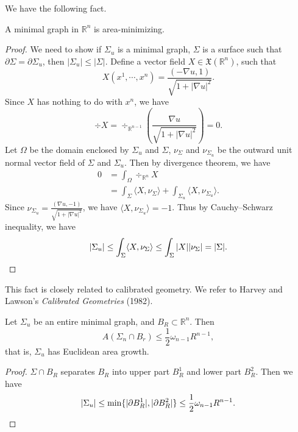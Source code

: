 We have the following fact.
\begin{prop}
    A minimal graph in $\mathbb{R}^n$ is area-minimizing.
\end{prop}
\begin{proof}
    We need to show if $\Sigma_u$ is a minimal graph, $\Sigma$ is a surface such that $\partial\Sigma=\partial\Sigma_u$, then $|\Sigma_u|\leq|\Sigma|$.
    Define a vector field $X\in\mathfrak{X}(\mathbb{R}^n)$, such that
    \[X(x^1,\cdots,x^n)=\frac{(-\nabla u,1)}{\sqrt{1+|\nabla u|^2}}.\]
    Since $X$ has nothing to do with $x^n$, we have
    \[\div{X}=\div\nolimits_{\mathbb{R}^{n-1}}\left(\frac{\nabla u}{\sqrt{1+|\nabla u|^2}}\right)=0.\]
    Let $\Omega$ be the domain enclosed by $\Sigma_u$ and $\Sigma$, $\nu_\Sigma$ and $\nu_{\Sigma_u}$ be the outward unit normal vector field of $\Sigma$ and $\Sigma_u$.
    Then by divergence theorem, we have
    \begin{align*}
        0&=\int_\Omega\div\nolimits_{\mathbb{R}^n}X\\
        &=\int_\Sigma\langle X,\nu_\Sigma\rangle+\int_{\Sigma_u}\langle X,\nu_{\Sigma_u}\rangle.
    \end{align*}
    Since $\nu_{\Sigma_u}=\frac{(\nabla u,-1)}{\sqrt{1+|\nabla u|^2}}$, we have $\langle X,\nu_{\Sigma_u}\rangle=-1$.
    Thus by Cauchy--Schwarz inequality, we have
    \[|\Sigma_u|\leq\int_\Sigma\langle X,\nu_\Sigma\rangle\leq\int_\Sigma|X||\nu_\Sigma|=|\Sigma|.\qedhere\]
\end{proof}

\begin{rem}
    This fact is closely related to calibrated geometry.
    We refer to Harvey and Lawson's \emph{Calibrated Geometries} (1982).
\end{rem}

\begin{cor}
    Let $\Sigma_u$ be an entire minimal graph, and $B_R\subset\mathbb{R}^n$.
    Then
    \[A(\Sigma_n\cap B_r)\leq\frac{1}{2}\omega_{n-1}R^{n-1},\]
    that is, $\Sigma_u$ has Euclidean area growth.
\end{cor}
\begin{proof}
    $\Sigma\cap B_R$ separates $B_R$ into upper part $B^1_R$ and lower part $B^2_R$.
    Then we have
    \[|\Sigma_u|\leq\min\{|\partial B^1_R|,|\partial B^2_R|\}\leq\frac{1}{2}\omega_{n-1}R^{n-1}.\qedhere\]
\end{proof}

